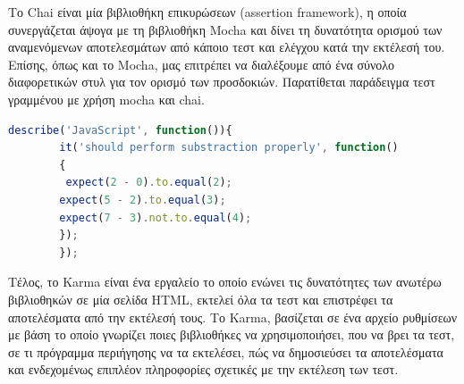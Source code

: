 		
		Το Chai είναι μία βιβλιοθήκη επικυρώσεων (assertion framework), η οποία συνεργάζεται άψογα με τη βιβλιοθήκη Mocha και δίνει τη δυνατότητα ορισμού των αναμενόμενων αποτελεσμάτων από κάποιο τεστ και ελέγχου κατά την εκτέλεσή του. Επίσης, όπως και το Mocha, μας επιτρέπει να διαλέξουμε από ένα σύνολο διαφορετικών στυλ για τον ορισμό των προσδοκιών. Παρατίθεται παράδειγμα τεστ γραμμένου με χρήση mocha και chai.
		
		\begin{lstlisting}[language=JavaScript]		
		describe('JavaScript', function()){
		it('should perform substraction properly', function() 
		{
	     expect(2 - 0).to.equal(2);
		expect(5 - 2).to.equal(3); 
		expect(7 - 3).not.to.equal(4);
		}); 
		});
				\end{lstlisting}
				
				Τέλος, το Karma είναι ένα εργαλείο το οποίο ενώνει τις δυνατότητες των ανωτέρω βιβλιοθηκών σε μία σελίδα HTML, εκτελεί όλα τα τεστ και επιστρέφει τα αποτελέσματα από την εκτέλεσή τους. Το Karma, βασίζεται σε ένα αρχείο ρυθμίσεων με βάση το οποίο γνωρίζει ποιες βιβλιοθήκες να χρησιμοποιήσει, που να βρει τα τεστ, σε τι πρόγραμμα περιήγησης να τα εκτελέσει, πώς να δημοσιεύσει τα αποτελέσματα και ενδεχομένως επιπλέον πληροφορίες σχετικές με την εκτέλεση των τεστ. 


